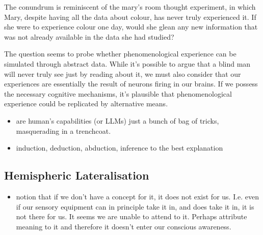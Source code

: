 The conundrum is reminiscent of the mary's room thought experiment, in which Mary, despite having all the data about colour, has never truly experienced it. If she were to experience colour one day, would she glean any new information that was not already available in the data she had studied?

The question seems to probe whether phenomenological experience can be simulated through abstract data. While it's possible to argue that a blind man will never truly see just by reading about it, we must also consider that our experiences are essentially the result of neurons firing in our brains. If we possess the necessary cognitive mechanisms, it's plausible that phenomenological experience could be replicated by alternative means.


\begin{itemize}
    \item are human's capabilities (or LLMs) just a bunch of bag of tricks, masquerading in a trenchcoat.
    \item induction, deduction, abduction, inference to the best explanation
\end{itemize}


\subsection{Hemispheric Lateralisation}
\begin{itemize}
    \item notion that if we don't have a concept for it, it does not exist for us. I.e. even if our sensory equipment can in principle take it in, and does take it in, it is not there for us. It seems we are unable to attend to it. Perhaps attribute meaning to it and therefore it doesn't enter our conscious awareness.
\end{itemize}




